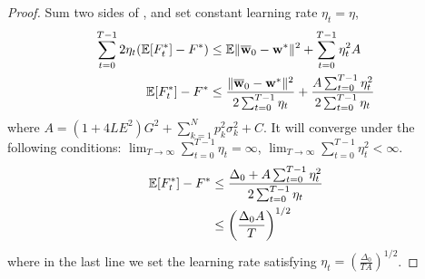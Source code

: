 \begin{proof}
Sum two sides of \eq{\ref{eq:cvxsgd1}}, and set constant learning rate $\eta_t = \eta$, 
\begin{align*}
    \sum_{t=0}^{T-1} 2\eta_t (\mathbb{E}[F^*_t] - F^* ) & \leq \mathbb{E} \|{\overline{\mathbf{w}}}_{0}-{\mathbf{w}}^{*}\|^{2} + \sum_{t=0}^{T-1}\eta_t^2 A\\
\mathbb{E}[ F_t^*] - F^*  & \leq \frac{\|{\overline{\mathbf{w}}}_{0}-{\mathbf{w}}^{*}\|^{2}}{2 \sum_{t=0}^{T-1} \eta_t } + \frac{A \sum_{t=0}^{T-1} \eta_t^2}{2 \sum_{t=0}^{T-1} \eta_t }
\end{align*}
where $A = (1 +4 L E^{2})G^{2} + \sum_{k=1}^{N} p_{k}^{2}\sigma_k^2 + C$.
It will converge under the following conditions: $ \lim_{T \rightarrow \infty }\sum_{t=0}^{T-1} \eta_t = \infty$, 
$ \lim_{T \rightarrow \infty }\sum_{t=0}^{T-1} \eta_t^2 < \infty$. 
\begin{align*}
	\mathbb{E}[ F_t^*] - F^*  & \leq \frac{\Delta_0 + A \sum_{t=0}^{T-1} \eta_t^2 }{2 \sum_{t=0}^{T-1} \eta_t }\\
	& \leq \left(\frac{ \Delta_0 A }{T}\right)^{1/2}
\end{align*}
where in the last line we set the learning rate satisfying $\eta_t =  \left(\frac{\Delta_0}{ TA }\right)^{1/2}$.
\end{proof}





